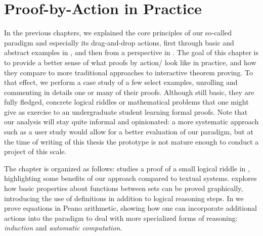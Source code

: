 \setchapterpreamble[u]{\margintoc}
\chapter{Proof-by-Action in Practice}

In the previous chapters, we explained the core principles of our so-called
 paradigm and especially its drag-and-drop actions, first through
basic and abstract examples in , and then from a 
perspective in . The goal of this chapter is to provide a better
sense of what proofs by action/ look like in practice, and how they compare
to more traditional approaches to interactive theorem proving. To that effect,
we perform a case study of a few select examples, unrolling and commenting in
details one or many of their proofs. Although still basic, they are fully
fledged, concrete logical riddles or mathematical problems that one might give
as exercise to an undergraduate student learning formal proofs. Note that our
analysis will stay quite informal and opinionated: a more systematic approach
such as a user study would allow for a better evaluation of our paradigm, but at
the time of writing of this thesis the  prototype is not mature enough to
conduct a project of this scale.

The chapter is organized as follows:  studies a proof of a small
logical riddle in , highlighting some benefits of our approach compared to
textual systems.  explores how basic properties about functions
between sets can be proved graphically, introducing the use of definitions in
addition to logical reasoning steps. In  we prove equations in
Peano arithmetic, showing how one can incorporate additional actions into the
paradigm to deal with more specialized forms of reasoning: \emph{induction} and
\emph{automatic computation}.


  
